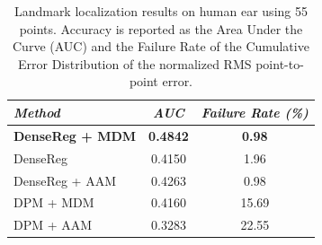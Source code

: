 \begin{table}[h!]
\centering
\begin{tabular}{|l|c|c|}
\hline
\emph{Method} & \emph{AUC} & \emph{Failure Rate (\%)}\\
\hline\hline
\textbf{DenseReg + MDM} & \textbf{0.4842} & \textbf{0.98} \\
DenseReg       &  0.4150 &   1.96 \\
DenseReg + AAM &  0.4263 &  0.98 \\
DPM + MDM      &  0.4160 &  15.69 \\
DPM + AAM      &  0.3283 &  22.55 \\
\hline
\end{tabular}
\caption{Landmark localization results on human ear using 55 points. Accuracy is reported as the Area Under the Curve (AUC) and the Failure Rate of the Cumulative Error Distribution of the normalized RMS point-to-point error.}
\label{tab:ears}
\end{table}
